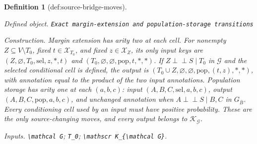\documentclass{article}
\newtheorem{definition}{Definition}
\begin{document}
\begin{definition}[def:source-bridge-moves]\label{def:source-bridge-moves}
\par\smallskip\noindent\emph{Defined object.} \texttt{Exact margin-\allowbreak{}extension and population-\allowbreak{}storage transitions}
\par\smallskip\noindent\emph{Construction.} Margin extension has arity two at each cell. For nonempty \(Z\subseteq V\setminus T_0\), fixed \(t\in\mathcal X_{T_0}\), and fixed \(z\in\mathcal X_Z\), its only input keys are \((Z,\varnothing,T_0,\mathrm{sel},z,\ast,t)\) and \((T_0,\varnothing,\varnothing,\mathrm{pop},t,\ast,\ast)\). If \(Z\perp\!\!\!\perp S\mid T_0\) in \(\mathcal G\) and the selected conditional cell is defined, the output is \((T_0\cup Z,\varnothing,\varnothing,\mathrm{pop},(t,z),\ast,\ast)\), with annotation equal to the product of the two input annotations. Population storage has arity one at each \((a,b,c)\): input \((A,B,C,\mathrm{sel},a,b,c)\), output \((A,B,C,\mathrm{pop},a,b,c)\), and unchanged annotation when \(A\perp\!\!\!\perp S\mid B,C\) in \(G_{\overline B}\). Every conditioning cell used by an input must have positive probability. These are the only source-changing moves, and every output belongs to \(\mathscr K_{\mathcal G}\).
\par\smallskip\noindent\emph{Inputs.} \texttt{\textbackslash{}\allowbreak{}mathcal G}; \texttt{T\_\allowbreak{}0}; \texttt{\textbackslash{}\allowbreak{}mathscr K\_\allowbreak{}\{\textbackslash{}\allowbreak{}mathcal G\}\allowbreak{}}.
\end{definition}
\end{document}
